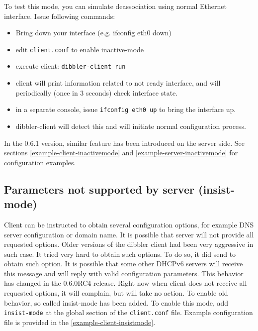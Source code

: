 To test this mode, you can simulate deassociation using normal
Ethernet interface. Issue following commands:

\begin{itemize}
\item Bring down your interface (e.g. ifconfig eth0 down)
\item edit \verb+client.conf+ to enable inactive-mode
\item execute client: \verb+dibbler-client run+
\item client will print information related to not ready interface,
  and will periodically (once in 3 seconds) check interface state.
\item in a separate console, issue \verb+ifconfig eth0 up+ to bring
  the interface up.
\item dibbler-client will detect this and will initiate normal
  configuration process.
\end{itemize}

In the 0.6.1 version, similar feature has been introduced on the
server side. See sections \ref{example-client-inactivemode} and
\ref{example-server-inactivemode} for configuration examples.

\subsection{Parameters not supported by server (insist-mode)}
\label{feature-insist-mode}

Client can be instructed to obtain several configuration options, for
example DNS server configuration or domain name. It is possible that server
will not provide all requested options. Older versions of
the dibbler client had been very aggressive in such case. It tried
very hard to obtain such options. To do so, it did send
 to obtain such option. It is possible that some
other DHCPv6 servers will receive this message and will reply with
valid configuration parameters. This behavior has
changed in the 0.6.0RC4 release. Right now when client does not
receive all requested options, it will complain, but will
take no action. To enable old behavior, so called insist-mode has been
added. To enable this mode, add \verb+insist-mode+ at the global
section of the \verb+client.conf+ file. Example configuration file is
provided in the \ref{example-client-insistmode}.

